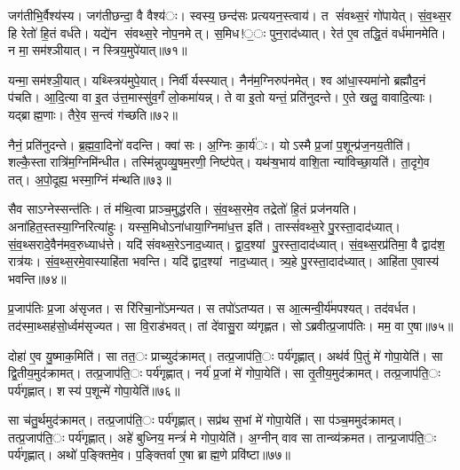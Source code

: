 जग॑तीभि॒र्वैश्य॑स्य। जग॑तीछन्दा॒ वै वैश्य॑ः। स्वस्य॒ छन्द॑सः प्रत्ययन॒स्त्वाय॑। त सं॑वथ्स॒रं गो॑पायेत्। सं॒व॒थ्स॒र हि रेतो॑ हि॒तं वर्ध॑ते। यद्ये॑न संवथ्स॒रे नोप॒नमेत्। स॒मिध!॒ः पुन॒राद॑ध्यात्। रेत॑ ए॒व तद्धि॒तं वर्ध॑मानमेति। न मा॒सम॑श्ञीयात्। न स्त्रिय॒मुपे॑यात्॥७१॥

यन्मा॒सम॑श्ञी॒यात्। यथ्स्त्रिय॑मुपे॒यात्। निर्वीर्यस्स्यात्। नैन॑म॒ग्निरुप॑नमेत्। श्व आ॑धा॒स्यमा॑नो ब्रह्मौद॒नं प॑चति। आ॒दि॒त्या वा इ॒त उ॑त्त॒मास्सु॑व॒र्गं लो॒कमा॑यन्न्। ते वा इ॒तो यन्तं॒ प्रति॑नुदन्ते। ए॒ते खलु॒ वावादि॒त्याः। यद्ब्राह्म॒णाः। तैरे॒व स॒न्त्वं ग॑च्छति॥७२॥

नैनं॒ प्रति॑नुदन्ते। ब्र॒ह्म॒वा॒दिनो॑ वदन्ति। क्वा॑ सः। अ॒ग्निः का॒र्य॑ः। योऽस्मै प्र॒जां प॒शून्प्र॑ज॒नय॒तीति॑। शल्कै॒स्तारात्रि॑म॒ग्निमि॑न्धीत। तस्मि॑न्नुपव्यु॒षम॒रणी॒ निष्ट॑पेत्। यथ॑ऱ्ष॒भाय॑ वाशि॒ता न्या॑विच्छा॒यति॑। ता॒दृगे॒व तत्। अ॒पो॒दूह्य॒ भस्मा॒ग्निं म॑न्थति॥७३॥

सैव साऽग्नेस्सन्त॑तिः। तं म॑थि॒त्वा प्राञ्च॒मुद्ध॑रति। सं॒व॒थ्स॒रमे॒व तद्रेतो॑ हि॒तं प्रज॑नयति। अना॑हित॒स्तस्या॒ग्निरित्या॑हुः। यस्स॒मिधोऽना॑धाया॒ग्निमा॑ध॒त्त इति॑। तास्सं॑वथ्स॒रे पु॒रस्ता॒दाद॑ध्यात्। सं॒व॒थ्सरादे॒वैन॑मव॒रुध्याध॑त्ते। यदि॑ संवथ्स॒रेऽनाद॒ध्यात्। द्वा॒द॒श्यां पु॒रस्ता॒दाद॑ध्यात्। सं॒व॒थ्स॒रप्र॑तिमा॒ वै द्वाद॑श॒ रात्र॑यः। सं॒व॒थ्स॒रमे॒वास्याहि॑ता भवन्ति। यदि॑ द्वाद॒श्यां नाद॒ध्यात्। त्र्य॒हे पु॒रस्ता॒दाद॑ध्यात्। आहि॑ता ए॒वास्य॑ भवन्ति॥७४॥

प्र॒जाप॑तिः प्र॒जा अ॑सृजत। स रि॑रिचा॒नो॑ऽमन्यत। स तपो॑ऽतप्यत। स आ॒त्मन्वी॒र्य॑मपश्यत्। तद॑वर्धत। तद॑स्मा॒थ्सह॑सो॒र्ध्वम॑सृज्यत। सा वि॒राड॑भवत्। तां दे॑वासु॒रा व्य॑गृह्णत। सोऽब्रवीत्प्र॒जाप॑तिः। मम॒ वा ए॒षा॥७५॥

दोहा॑ ए॒व यु॒ष्माक॒मिति॑। सा तत॒ः प्राच्युद॑क्रामत्। तत्प्र॒जाप॑ति॒ः पर्य॑गृह्णात्। अथ॑र्व पि॒तुं मे॑ गोपा॒येति॑। सा द्वि॒तीय॒मुद॑क्रामत्। तत्प्र॒जाप॑ति॒ः पर्य॑गृह्णात्। नर्य॑ प्र॒जां मे॑ गोपा॒येति॑। सा तृ॒तीय॒मुद॑क्रामत्। तत्प्र॒जाप॑ति॒ः पर्य॑गृह्णात्। शस्य॑ प॒शून्मे॑ गोपा॒येति॑॥७६॥

सा च॑तु॒र्थमुद॑क्रामत्। तत्प्र॒जाप॑ति॒ः पर्य॑गृह्णात्। सप्र॑थ स॒भां मे॑ गोपा॒येति॑। सा प॑ञ्च॒ममुद॑क्रामत्। तत्प्र॒जाप॑ति॒ः पर्य॑गृह्णात्। अहे॑ बुध्निय॒ मन्त्रं॑ मे गोपा॒येति॑। अ॒ग्नीन् वाव सा तान्व्य॑क्रमत। तान्प्र॒जाप॑ति॒ः पर्य॑गृह्णात्। अथो॑ प॒ङ्क्तिमे॒व। प॒ङ्क्तिर्वा ए॒षा ब्राह्म॒णे प्रवि॑ष्टा॥७७॥

